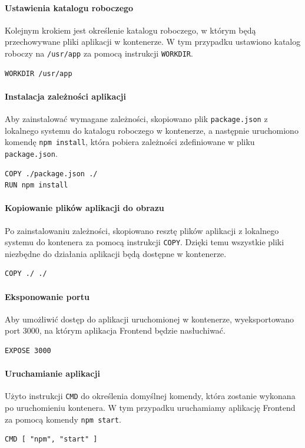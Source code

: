\paragraph{Ustawienia katalogu roboczego}
Kolejnym krokiem jest określenie katalogu roboczego, w którym będą przechowywane pliki aplikacji w kontenerze. W tym przypadku ustawiono katalog roboczy na \texttt{/usr/app} za pomocą instrukcji \texttt{WORKDIR}.
\begin{lstlisting}[basicstyle=\footnotesize\ttfamily]
WORKDIR /usr/app
\end{lstlisting}

\paragraph{Instalacja zależności aplikacji}
Aby zainstalować wymagane zależności, skopiowano plik \texttt{package.json} z lokalnego systemu do katalogu roboczego w kontenerze, a następnie uruchomiono komendę \texttt{npm install}, która pobiera zależności zdefiniowane w pliku \texttt{package.json}.
\begin{lstlisting}[basicstyle=\footnotesize\ttfamily]
COPY ./package.json ./
RUN npm install
\end{lstlisting}

\paragraph{Kopiowanie plików aplikacji do obrazu}
Po zainstalowaniu zależności, skopiowano resztę plików aplikacji z lokalnego systemu do kontenera za pomocą instrukcji \texttt{COPY}. Dzięki temu wszystkie pliki niezbędne do działania aplikacji będą dostępne w kontenerze.
\begin{lstlisting}[basicstyle=\footnotesize\ttfamily]
COPY ./ ./
\end{lstlisting}

\paragraph{Eksponowanie portu}
Aby umożliwić dostęp do aplikacji uruchomionej w kontenerze, wyeksportowano port 3000, na którym aplikacja Frontend będzie nasłuchiwać.
\begin{lstlisting}[basicstyle=\footnotesize\ttfamily]
EXPOSE 3000
\end{lstlisting}

\paragraph{Uruchamianie aplikacji}
Użyto instrukcji \texttt{CMD} do określenia domyślnej komendy, która zostanie wykonana po uruchomieniu kontenera. W tym przypadku uruchamiamy aplikację Frontend za pomocą komendy \texttt{npm start}.
\begin{lstlisting}[basicstyle=\footnotesize\ttfamily]
CMD [ "npm", "start" ]
\end{lstlisting}


